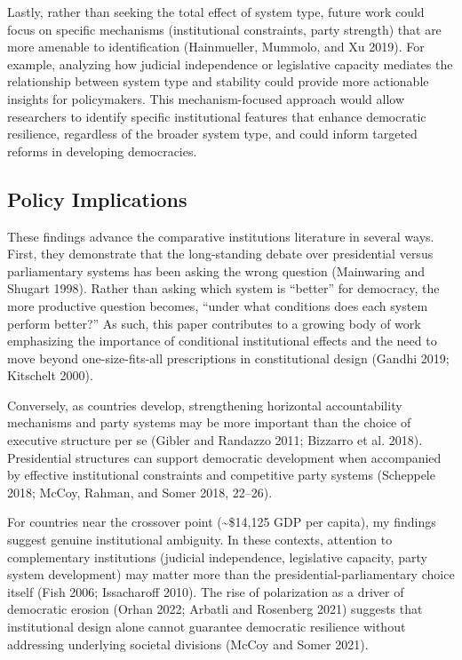 \documentclass[
  letterpaper,
  DIV=11,
  numbers=noendperiod]{scrartcl}
\begin{document}
Lastly, rather than seeking the total effect of system type, future work
could focus on specific mechanisms (institutional constraints, party
strength) that are more amenable to identification (Hainmueller,
Mummolo, and Xu 2019). For example, analyzing how judicial independence
or legislative capacity mediates the relationship between system type
and stability could provide more actionable insights for policymakers.
This mechanism-focused approach would allow researchers to identify
specific institutional features that enhance democratic resilience,
regardless of the broader system type, and could inform targeted reforms
in developing democracies.

\subsection{Policy Implications}\label{policy-implications}

These findings advance the comparative institutions literature in
several ways. First, they demonstrate that the long-standing debate over
presidential versus parliamentary systems has been asking the wrong
question (Mainwaring and Shugart 1998). Rather than asking which system
is ``better'' for democracy, the more productive question becomes,
``under what conditions does each system perform better?'' As such, this
paper contributes to a growing body of work emphasizing the importance
of conditional institutional effects and the need to move beyond
one-size-fits-all prescriptions in constitutional design (Gandhi 2019;
Kitschelt 2000).

Conversely, as countries develop, strengthening horizontal
accountability mechanisms and party systems may be more important than
the choice of executive structure per se (Gibler and Randazzo 2011;
Bizzarro et al. 2018). Presidential structures can support democratic
development when accompanied by effective institutional constraints and
competitive party systems (Scheppele 2018; McCoy, Rahman, and Somer
2018, 22--26).

For countries near the crossover point (\textasciitilde\$14,125 GDP per
capita), my findings suggest genuine institutional ambiguity. In these
contexts, attention to complementary institutions (judicial
independence, legislative capacity, party system development) may matter
more than the presidential-parliamentary choice itself (Fish 2006;
Issacharoff 2010). The rise of polarization as a driver of democratic
erosion (Orhan 2022; Arbatli and Rosenberg 2021) suggests that
institutional design alone cannot guarantee democratic resilience
without addressing underlying societal divisions (McCoy and Somer 2021).
\end{document}
